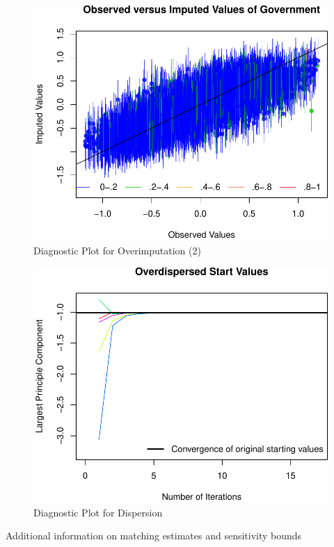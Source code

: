 \documentclass[12pt,]{article}
\begin{document}
\begin{figure}[htbp]
\centering
\includegraphics{figures/missing5-1.pdf}
\caption{Diagnostic Plot for Overimputation (2)}
\end{figure}

\clearpage

\begin{figure}[htbp]
\centering
\includegraphics{figures/missing6-1.pdf}
\caption{Diagnostic Plot for Dispersion}
\end{figure}

Additional information on matching estimates and sensitivity bounds
\end{document}
